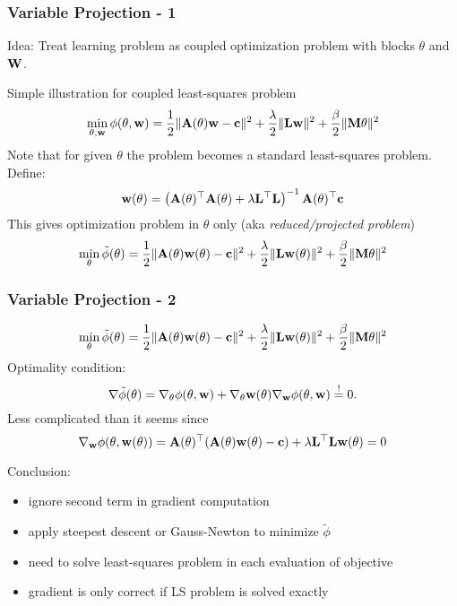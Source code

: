 \documentclass[12pt,fleqn]{beamer}
\begin{document}
\begin{frame}\frametitle{Variable Projection - 1}
	Idea: Treat learning problem as coupled optimization problem with blocks $\theta$ and ${\bf W}$. 
	
	Simple illustration for coupled least-squares problem~\cite{GoPe1973,GoPe03,OLearyRust2013}
	$$
		\min_{\theta,{\bf w}} \phi(\theta,{\bf w}) = {\frac 12} \| {\bf A}(\theta) {\bf w} - {\bf c}\|^2 + \frac{\lambda}{2}\| {\bf L} {\bf w}\|^2 + \frac{\beta}{2} \| {\bf M} \theta\|^2
	$$
	Note that for given $\theta$ the problem becomes a standard least-squares problem. Define: 
	$$
		{\bf w}(\theta) = \left( {\bf A}(\theta)^\top {\bf A}(\theta) + \lambda {\bf L}^\top {\bf L} \right)^{-1}{{\bf A}(\theta)^\top {\bf c}}
	$$
	This gives optimization problem in $\theta$ only (aka \emph{reduced/projected  problem})
	$$
		\min_{\theta} \tilde{\phi}(\theta) = {\frac 12} \| {\bf A}(\theta) {\bf w}(\theta) - {\bf c}\|^2 + \frac{\lambda}{2}\| {\bf L} {\bf w}(\theta)\|^2 + \frac{\beta}{2} \| {\bf M} \theta\|^2
	$$
	
\end{frame}
\begin{frame}\frametitle{Variable Projection - 2}
	$$
		\min_{\theta} \tilde{\phi}(\theta) = {\frac 12} \| {\bf A}(\theta) {\bf w}(\theta) - {\bf c}\|^2 + \frac{\lambda}{2}\| {\bf L} {\bf w}(\theta)\|^2 + \frac{\beta}{2} \| {\bf M} \theta\|^2
	$$
	Optimality condition:
	$$ 
		\nabla \tilde{\phi}(\theta) = \nabla_\theta \phi(\theta,{\bf w}) + \nabla_\theta {\bf w}(\theta) \nabla_{{\bf w}} \phi(\theta,{\bf w}) \stackrel{!}{=} 0.
	$$
	Less complicated than it seems since
	$$
		\nabla_{{\bf w}} \phi(\theta,{\bf w}(\theta)) = {\bf A}(\theta)^\top( {\bf A}(\theta) {\bf w}(\theta) - {\bf c}) + \lambda {\bf L}^\top {\bf L} {\bf w}(\theta) = 0
	$$
	
	Conclusion:
	\begin{itemize}
		\item ignore second term in gradient computation
		\item apply steepest descent or Gauss-Newton  to minimize $\tilde{\phi}$
		\item need to solve least-squares problem in each evaluation of objective
		\item gradient is only correct if LS problem is solved exactly
	\end{itemize}
	
\end{frame}
\end{document}
